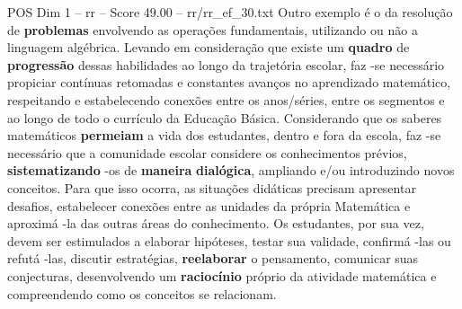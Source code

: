 \begin{textsample}{POS Dim 1 – rr – Score 49.00 – rr/rr\_ef\_30.txt}
Outro exemplo é o da resolução de \textbf{problemas} envolvendo as operações fundamentais, utilizando ou não a linguagem algébrica.
Levando em consideração que existe um \textbf{quadro} de \textbf{progressão} dessas habilidades ao longo da trajetória escolar, faz -se necessário propiciar contínuas retomadas e constantes avanços no aprendizado matemático, respeitando e estabelecendo conexões entre os anos/séries, entre os segmentos e ao longo de todo o currículo da Educação Básica.
Considerando que os saberes matemáticos \textbf{permeiam} a vida dos estudantes, dentro e fora da escola, faz -se necessário que a comunidade escolar considere os conhecimentos prévios, \textbf{sistematizando} -os de \textbf{maneira} \textbf{dialógica}, ampliando e/ou introduzindo novos conceitos.
Para que isso ocorra, as situações didáticas precisam apresentar desafios, estabelecer conexões entre as unidades da própria Matemática e aproximá -la das outras áreas do conhecimento.
Os estudantes, por sua vez, devem ser estimulados a elaborar hipóteses, testar sua validade, confirmá -las ou refutá -las, discutir estratégias, \textbf{reelaborar} o pensamento, comunicar suas conjecturas, desenvolvendo um \textbf{raciocínio} próprio da atividade matemática e compreendendo como os conceitos se relacionam.

\end{textsample}
